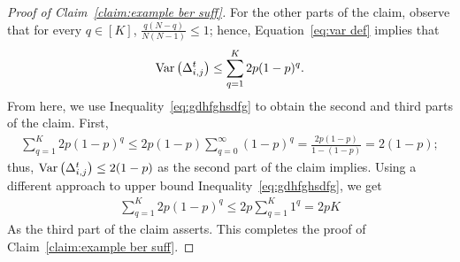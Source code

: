 \begin{proof}[Proof of Claim~\ref{claim:example ber suff}]
For the other parts of the claim, observe that for every $q \in [K]$, $ \frac{q(N-q)}{N(N-1)} \leq 1$; hence, Equation~\eqref{eq:var def} implies that 
\begin{align}\label{eq:gdhfghsdfg}
\mathrm{Var}\left( \Delta_{i,j}^t \right) \leq \sum_{q=1}^K 2 p (1 - p)^{q}.
\end{align}
From here, we use Inequality~\eqref{eq:gdhfghsdfg} to obtain the second and third parts of the claim. First,
\begin{align*}
\sum_{q=1}^K 2 p (1 - p)^{q} \leq 2 p (1 - p) \sum_{q=0}^\infty (1 - p)^{q} = \frac{ 2 p (1 - p)}{1-(1-p)} = 2(1 - p);
\end{align*}
thus, $\mathrm{Var}\left( \Delta_{i,j}^t \right) \leq  2(1-p)$ as the second part of the claim implies. Using a different approach to upper bound Inequality~\eqref{eq:gdhfghsdfg}, we get
\begin{align*}
\sum_{q=1}^K 2 p (1 - p)^{q} \leq 2p \sum_{q=1}^K 1^{q}=2pK
\end{align*}
As the third part of the claim asserts. This completes the proof of Claim~\ref{claim:example ber suff}.
\end{proof}



\iffalse %
Next, we move to the third part of the claim. Applying another approach to upper bound the right-hand-side of Equation~\eqref{eq:var def}, we obtain
\begin{align}\label{eq:var upper}
\sum_{q=1}^K 2 p (1 - p)^{q}\frac{q(N-q)}{N(N-1)} &=  \frac{2p}{N (N-1)} \sum_{q=1}^K (1 - p)^{q}q(N-q) \leq \frac{2p}{N (N-1)} \sum_{q=1}^K (1 - p)^{q}q (N -1) 
\nonumber \\
& = \frac{2p}{N} \sum_{q=1}^K (1 - p)^{q}q   \leq \frac{2p}{N}  \sum_{q=0}^\infty (1 - p)^{q}q.
\end{align}
Due to  Observation~\ref{obs:geo and mul} below,
\[
\sum_{q=0}^\infty (1 - p)^{q}q \leq \frac{1-p}{p^2}.
\]
Combining this with Inequality~\eqref{eq:var upper}, we ultimately obtain 
\[
\var{\Delta_{i,j}^t} \leq \frac{2p}{N} \frac{1-p}{p^2} = \frac{2(1-p)}{N p}.
\]
This completes the proof of Claim~\ref{claim:example ber suff}.
\end{proof}
\begin{observation}\label{obs:geo and mul}
For any $x\in (0,1)$, it holds that 
\[
\sum_{q=0}^\infty q x^{q} \leq \frac{x}{(1-x)^2}.
\]
\end{observation}
\begin{proof}[Proof of Observation~\ref{obs:geo and mul}]
Starting from $\sum_{n=0}^\infty x^n = \frac{1}{1-x}$, we differentiate both sides by $x$ to obtain
\[
\frac{d}{dx}\left(\sum_{n=0}^\infty x^n \right) = \frac{d}{dx}\left( \frac{1}{1-x} \right)\Leftrightarrow \sum_{n=0}^\infty n x^{n-1}  = \frac{1}{(1-x)^2} \Leftrightarrow \sum_{n=0}^\infty n x^{n}  = \frac{x}{(1-x)^2},
\]
where the last transition follows from multiplying both sides by $x$.
\end{proof}
\fi



